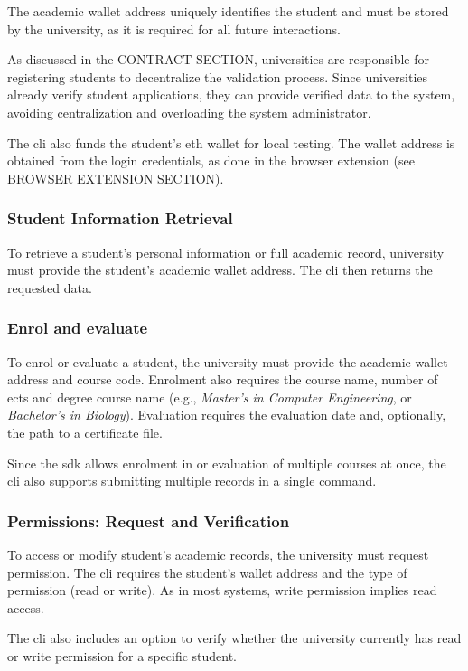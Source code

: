 The academic wallet address uniquely identifies the student and must be stored by the university, as it is required for all future interactions. 

As discussed in the CONTRACT SECTION, universities are responsible for registering students to decentralize the validation process. Since universities already verify student applications, they can provide verified data to the system, avoiding centralization and overloading the system administrator.

The \acrshort{cli} also funds the student's \acrlong{eth} wallet  for local testing. The wallet address is obtained from the login credentials, as done in the browser extension (see BROWSER EXTENSION SECTION).

\subsubsection{Student Information Retrieval}
To retrieve a student's personal information or full academic record, university must provide the student's academic wallet address. The \acrshort{cli} then returns the requested data.

\subsubsection{Enrol and evaluate}
To enrol or evaluate a student, the university must provide the academic wallet address and course code. Enrolment also requires the course name, number of \acrshort{ects} and degree course name (e.g., \textit{Master's in Computer Engineering}, or \textit{Bachelor's in Biology}). Evaluation requires the evaluation date and, optionally, the path to a certificate file. 

Since the \acrshort{sdk} allows enrolment in or evaluation of multiple courses at once, the \acrshort{cli} also supports submitting multiple records in a single command.     

\subsubsection{Permissions: Request and Verification}
To access or modify student's academic records, the university must request permission. The \acrshort{cli} requires the student's wallet address and the type of permission (read or write). As in most systems, write permission implies read access.

The \acrshort{cli} also includes an option to verify whether the university currently has read or write permission for a specific student.

